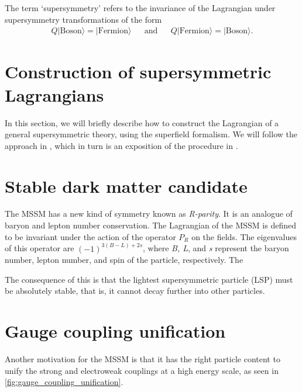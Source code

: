 The term `supersymmetry' refers to the invariance of the Lagrangian under supersymmetry transformations of the form
\begin{align*}
  Q|\text{Boson}\rangle = |\text{Fermion}\rangle &&\text{and}&& Q|\text{Fermion}\rangle = |\text{Boson}\rangle.
\end{align*}

\section{Construction of supersymmetric Lagrangians}
In this section, we will briefly describe how to construct the Lagrangian of a general supersymmetric theory, using the superfield formalism. We will follow the approach in \citep{Zee2010}, which in turn is an exposition of the procedure in \citep{Salam1974}.

\section{Stable dark matter candidate}
The MSSM has a new kind of symmetry known as \emph{R-parity}. It is an analogue of baryon and lepton number conservation. The Lagrangian of the MSSM is defined to be invariant under the action of the operator $P_R$ on the fields. The eigenvalues of this operator are $(-1)^{3(B-L)+2s}$, where \emph{B, L}, and \emph{s} represent the baryon number, lepton number, and spin of the particle, respectively. The  

The consequence of this is that the lightest supersymmetric particle (LSP) must be absolutely stable, that is, it cannot decay further into other particles.

\section{Gauge coupling unification}
Another motivation for the MSSM is that it has the right particle content to unify the strong and electroweak couplings at a high energy scale, as seen in \autoref{fig:gauge_coupling_unification}.

